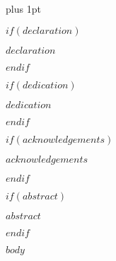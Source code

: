 \documentclass[a4paper,oneside,12pt]{template/latex/leedsthesis}
\title{\thesistitle}
\author{\Large \thesisauthor}
\author{\thesisauthor}
\newcommand*{\bibtitle}{$bib-pdf-heading$}
\newcommand*{\bibtitle}{References}
\begin{document}

\renewcommand\baselinestretch{1.2}
\baselineskip=18pt plus 1pt




\maketitle
\setcounter{secnumdepth}{3}
\setcounter{tocdepth}{2}
\renewcommand\thesubsubsection{\thesubsection.\Alph{subsubsection}} 

\let\oldparagraph\paragraph
\renewcommand{\paragraph}[1]{\oldparagraph{#1}\mbox{}\\}

\frontmatter

$if(declaration)$
    \begin{declaration}
        $declaration$
    \end{declaration}
$endif$

$if(dedication)$
    \begin{dedication}
        \textit{$dedication$}
    \end{dedication}
$endif$

$if(acknowledgements)$
    \begin{acknowledgements}
        $acknowledgements$
    \end{acknowledgements}
$endif$

$if(abstract)$
    \begin{abstractslong}
        $abstract$
    \end{abstractslong}
$endif$

\mainmatter

$body$

\setlength{\baselineskip}{0pt}
{\renewcommand*\MakeUppercase[1]{#1}%
\printbibliography[heading=bibintoc,title={\bibtitle}]}
\end{document}
